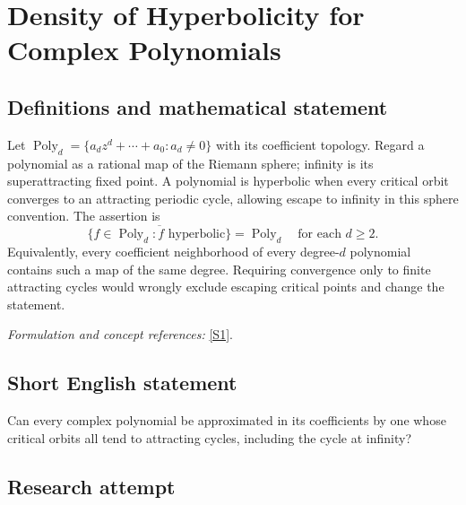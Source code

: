 \documentclass[11pt,a4paper]{article}
\newcommand{\sref}[2]{\hyperlink{source:#1:#2}{[S#2]}}
\newif\ifshowcatalogue
\newcommand{\cataloguescope}[1]{\ifshowcatalogue
 \paragraph{Exact scope in the supplied catalogue.}
 \begin{quote}\small #1\end{quote}\fi}
\begin{document}
\setcounter{section}{0}
\clearpage
\section*{\texorpdfstring{Density of Hyperbolicity for Complex Polynomials}{Density of Hyperbolicity for Complex Polynomials}}\label{30006793}
\subsection{Definitions and mathematical statement}
Let $\operatorname{Poly}_d=\{a_dz^d+\cdots+a_0:a_d\ne0\}$ with its coefficient topology. Regard a polynomial as a rational map of the Riemann sphere; infinity is its superattracting fixed point. A polynomial is hyperbolic when every critical orbit converges to an attracting periodic cycle, allowing escape to infinity in this sphere convention. The assertion is
\[
 \overline{\{f\in\operatorname{Poly}_d:f\text{ hyperbolic}\}}=\operatorname{Poly}_d
 \quad\text{for each }d\ge2.
\]
Equivalently, every coefficient neighborhood of every degree-$d$ polynomial contains such a map of the same degree. Requiring convergence only to finite attracting cycles would wrongly exclude escaping critical points and change the statement.
\par\smallskip\textit{Formulation and concept references:} \sref{30006793}{1}.
\cataloguescope{For each complex polynomial T of degree at least two, determine whether T can be approximated by polynomials of the same degree all of whose critical points converge under iteration to attracting periodic cycles, that is, whether hyperbolic polynomials are dense in the space of complex polynomials of each degree.}
\subsection{Short English statement}
Can every complex polynomial be approximated in its coefficients by one whose critical orbits all tend to attracting cycles, including the cycle at infinity?
\subsection{Research attempt}
\end{document}
